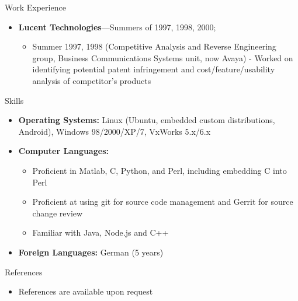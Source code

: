 \documentclass[10pt,oneside]{article}
\newenvironment{ressection}[1]{
	\vspace{4pt}
	{\Large#1}
	\begin{itemize}
	\vspace{3pt}
}{
	\end{itemize}
}
\newcommand{\resitem}[1]{
	\vspace{-4pt}
	\item \begin{flushleft} #1 \end{flushleft}
}
\newcommand{\ressubitem}[1]{
	\vspace{-1pt}
	\item \begin{flushleft} #1 \end{flushleft}
}
\newcommand{\resbigitem}[3]{
	\vspace{-5pt}
	\item
	\textbf{#1}---#2; \quad \textit{#3}
}
\newenvironment{ressubsec}[3]{
	\resbigitem{#1}{#2}{#3}
	\vspace{-2pt}
	\begin{itemize}
}{
	\end{itemize}
}
\newenvironment{reslist}[1]{
	\resitem{\textbf{#1}}
	\vspace{-5pt}
	\begin{itemize}
}{
	\end{itemize}
}
\newenvironment{ressection}[1]{
	\vspace{4pt}
	{\fontfamily{phv}\selectfont\Large#1}
	\begin{itemize}[leftmargin=12pt]
	\vspace{3pt}
}{
	\end{itemize}
}
\newcommand{\resitem}[1]{
	\vspace{-4pt}
	\item \begin{flushleft} #1 \end{flushleft}
}
\newcommand{\ressubitem}[1]{
	\vspace{-1pt}
	\item \begin{flushleft} #1 \end{flushleft}
}
\newcommand{\resbigitem}[2]{
	\vspace{-5pt}
	\item
	\textbf{#1}---\textit{#2}
}
\newenvironment{ressubsec}[2]{
	\resbigitem{#1}{#2}
	\vspace{-2pt}
	\begin{itemize}[leftmargin=12pt]
}{
	\end{itemize}
}
\newenvironment{reslist}[1]{
	\resitem{\textbf{#1}}
	\vspace{-5pt}
	\begin{itemize}[leftmargin=12pt]
}{
	\end{itemize}
}
\begin{document}
\begin{ressection}{Work Experience}
	\begin{ressubsec}{Lucent Technologies}{Summers of 1997, 1998, 2000}
	  \ressubitem{2000 (Silicon Processing Research Group) Independently created a CGI front-end to a simulation tool and software to process an ion implantation simulator output. Independently initiated a port of simulation tools from older Unix variants to Linux so that extensive simulation could be done on a low end machine to meet deadlines.}
          \ressubitem{Summer 1997, 1998 (Competitive Analysis and Reverse Engineering group, Business Communications Systems unit, now Avaya) - Worked on identifying potential patent infringement and cost/feature/usability analysis of competitor's products}
	\end{ressubsec}

\end{ressection}

\begin{ressection}{Skills}

	\resitem{\textbf{Operating Systems:} Linux (Ubuntu, embedded custom distributions, Android), Windows 98/2000/XP/7, VxWorks 5.x/6.x}

	\begin{reslist}{\textbf{Computer Languages:}}
	  \ressubitem{Proficient in Matlab, C, Python, and Perl, including embedding C into Perl}
          \ressubitem{Proficient at using git for source code management and Gerrit for source change review}
	  \ressubitem{Familiar with Java, Node.js and C++}
	\end{reslist}

	\resitem{\textbf{Foreign Languages:} German (5 years)}

\end{ressection}

\begin{ressection}{References}
  \resitem{References are available upon request}
\end{ressection}
\end{document}
